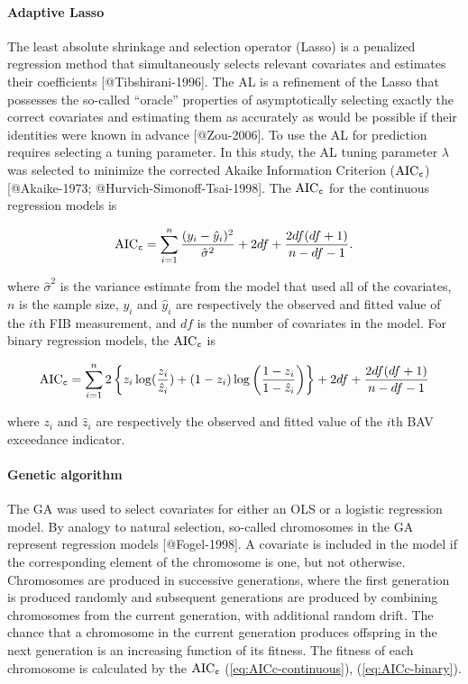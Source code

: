 \paragraph{Adaptive Lasso}\label{adaptive-lasso}

The least absolute shrinkage and selection operator (Lasso) is a
penalized regression method that simultaneously selects relevant
covariates and estimates their coefficients {[}@Tibshirani-1996{]}. The
AL is a refinement of the Lasso that possesses the so-called ``oracle''
properties of asymptotically selecting exactly the correct covariates
and estimating them as accurately as would be possible if their
identities were known in advance {[}@Zou-2006{]}. To use the AL for
prediction requires selecting a tuning parameter. In this study, the AL
tuning parameter \(\lambda\) was selected to minimize the corrected
Akaike Information Criterion (\(\text{AIC}_{\tt c}\)) {[}@Akaike-1973;
@Hurvich-Simonoff-Tsai-1998{]}. The \(\text{AIC}_{\tt c}\) for the
continuous regression models is

\begin{align}\label{eq:AICc-continuous}
\text{AIC}_{\tt c} = \sum_{i=1}^n \frac{(y_i - \hat{y}_i)^2}{\hat{\sigma}^2} + 2df + \frac{2df(df+1)}{n-df-1}.
\end{align}

where \(\hat{\sigma}^2\) is the variance estimate from the model that
used all of the covariates, \(n\) is the sample size, \(y_i\) and
\(\hat{y}_i\) are respectively the observed and fitted value of the
\(i\)th FIB measurement, and \(df\) is the number of covariates in the
model. For binary regression models, the \(\text{AIC}_{\tt c}\) is

\begin{align}\label{eq:AICc-binary}
\text{AIC}_{\tt c} = \sum_{i=1}^n  2\left\{ z_i \log (\frac{z_i}{\hat{z}_i}) + (1-z_i) \log \left( \frac{1-z_i}{1-\hat{z}_i} \right) \right\} + 2df + \frac{2df(df+1)}{n-df-1}
\end{align}

where \(z_i\) and \(\hat{z}_i\) are respectively the observed and fitted
value of the \(i\)th BAV exceedance indicator.

\paragraph{Genetic algorithm}\label{genetic-algorithm}

The GA was used to select covariates for either an OLS or a logistic
regression model. By analogy to natural selection, so-called chromosomes
in the GA represent regression models {[}@Fogel-1998{]}. A covariate is
included in the model if the corresponding element of the chromosome is
one, but not otherwise. Chromosomes are produced in successive
generations, where the first generation is produced randomly and
subsequent generations are produced by combining chromosomes from the
current generation, with additional random drift. The chance that a
chromosome in the current generation produces offspring in the next
generation is an increasing function of its fitness. The fitness of each
chromosome is calculated by the \(\text{AIC}_{\tt c}\)
(\ref{eq:AICc-continuous}), (\ref{eq:AICc-binary}).

